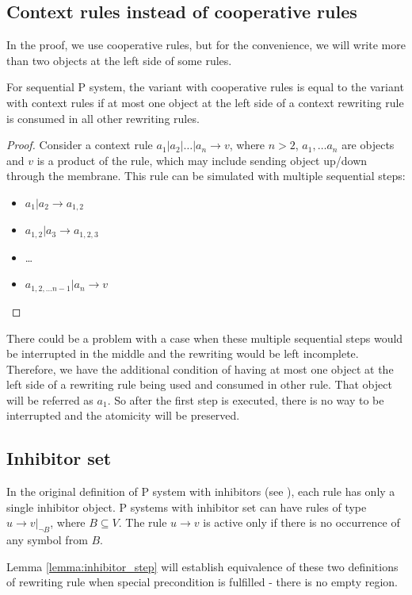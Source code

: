 \subsection{Context rules instead of cooperative rules}
  In the proof, we use cooperative rules, but for the convenience, we will write more than two objects at the left side of some rules.
  \begin{lemma}
  \label{lemma:context_rules}
    For sequential P system, the variant with cooperative rules is equal to the variant with context rules if at most one  object at the left side of a context rewriting rule is consumed in all other rewriting rules.
  \end{lemma}
  \begin{proof}
    Consider a context rule $a_1|a_2|\dots|a_n \rightarrow v$, where $n>2$, $a_1,\dots a_n$ are objects and $v$ is a product of the rule, which may include sending object up/down through the membrane.
    This rule can be simulated with multiple sequential steps:
    \begin{itemize}
      \item $a_1|a_2 \rightarrow a_{1,2}$
      \item $a_{1,2}|a_3 \rightarrow a_{1,2,3}$
      \item \dots
      \item $a_{1,2,\dots n-1}|a_n \rightarrow v$
    \end{itemize}    
  \end{proof}
  There could be a problem with a case when these multiple sequential steps would be interrupted in the middle and the rewriting would be left incomplete. Therefore, we have the additional condition of having at most one object at the left side of a rewriting rule being used and consumed in other rule. That object will be referred as $a_1$. So after the first step is executed, there is no way to be interrupted and the atomicity will be preserved.

\subsection{Inhibitor set}
In the original definition of P system with inhibitors (see \cite{Ionescu:jucs_10_5:on_p_systems_with}), each rule has only a single inhibitor object. P systems with inhibitor set can have rules of type $u\rightarrow v|_{\neg B}$, where $B\subseteq V$. The rule $u\rightarrow v$ is active only if there is no occurrence of any symbol from $B$.

Lemma \ref{lemma:inhibitor_step} will establish equivalence of these two definitions of rewriting rule when special precondition is fulfilled - there is no empty region.

